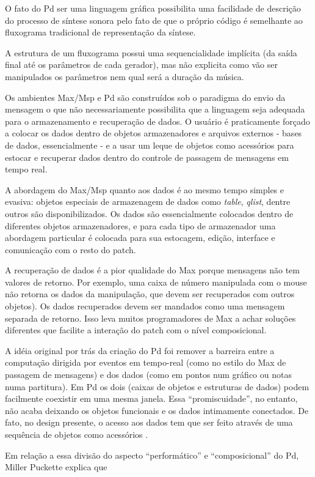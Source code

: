 \documentclass[draft]{ppgmus}
\begin{document}
O fato do Pd ser uma linguagem gráfica possibilita uma facilidade de
descrição do processo de síntese sonora pelo fato de que o próprio
código é semelhante ao fluxograma tradicional de representação da
síntese.

 A estrutura de um fluxograma
possui uma sequencialidade implícita (da saída final até os parâmetros
de cada gerador), mas não explicita como vão ser manipulados os
parâmetros nem qual será a duração da música.

Os ambientes Max/Msp e Pd são construídos sob o paradigma do envio
da mensagem o que não necessariamente possibilita que a linguagem seja
adequada para o armazenamento e recuperação de dados. O usuário é
praticamente forçado a colocar os dados dentro de objetos armazenadores e 
arquivos externos - bases
de dados, essencialmente - e a usar um leque de objetos como
acessórios para estocar e recuperar dados dentro do controle de
passagem de mensagens em tempo real.

A abordagem do Max/Msp quanto aos dados é ao mesmo tempo simples e
evasiva: objetos especiais de armazenagem de dados como
\textit{table}, \textit{qlist}, dentre outros são disponibilizados. Os
dados são essencialmente colocados dentro de diferentes objetos armazenadores, e
para cada tipo de armazenador uma abordagem particular é colocada
para sua estocagem, edição, interface e comunicação com o resto do
patch.

A recuperação de dados é a pior qualidade do Max porque mensagens não tem valores de
retorno. Por exemplo, uma caixa de número manipulada com o mouse não
retorna os dados da manipulação, que devem ser recuperados com outros
objetos). Os dados recuperados devem ser mandados como uma mensagem
separada de retorno. Isso leva muitos programadores de Max a achar
soluções diferentes que facilite a interação do patch com o nível
composicional.

A idéia original por trás da criação do Pd foi remover a barreira
entre a computação dirigida por eventos em tempo-real (como no estilo
do Max de passagem de mensagens) e dos dados (como em pontos num
gráfico ou notas numa partitura). Em Pd os dois (caixas de objetos e
estruturas de dados) podem facilmente coexistir em uma mesma janela.
Essa ``promiscuidade'', no entanto, não acaba deixando os objetos
funcionais e os dados intimamente conectados. De fato, no design
presente, o acesso aos dados tem que ser feito através de uma
sequência de objetos como acessórios .

Em relação a essa divisão do aspecto ``performático'' e
``composicional'' do Pd, Miller Puckette explica que
\end{document}
